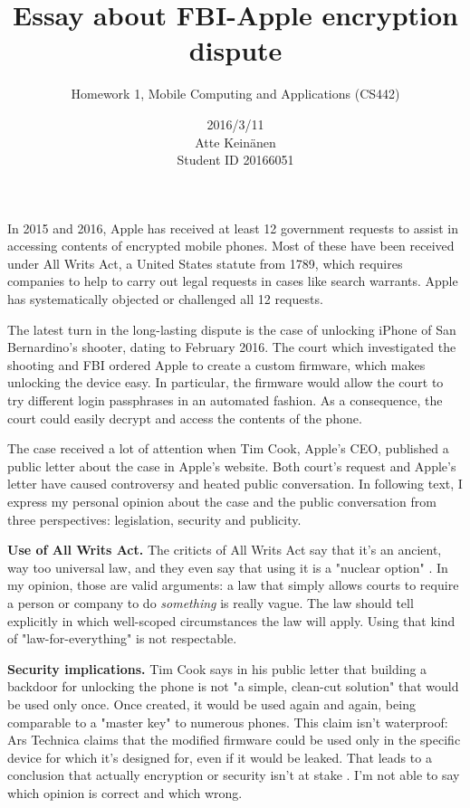 \documentclass[twoside]{article}
\title{Essay about FBI-Apple encryption dispute}
\subtitle{Homework 1, Mobile Computing and Applications (CS442)}
\author{2016/3/11\protect\\Atte Keinänen\protect\\Student ID 20166051}
\date{}
\begin{document}
\maketitle{}

In 2015 and 2016, Apple has received at least 12 government requests to assist in accessing contents of encrypted mobile phones. Most of these have been received under All Writs Act, a United States statute from 1789, which requires companies to help to carry out legal requests in cases like search warrants. Apple has systematically objected or challenged all 12 requests. \cite{courtfilings}

The latest turn in the long-lasting dispute is the case of unlocking iPhone of San Bernardino's shooter, dating to February 2016. The court which investigated the shooting and FBI ordered Apple to create a custom firmware, which makes unlocking the device easy. In particular, the firmware would allow the court to try different login passphrases in an automated fashion. As a consequence, the court could easily decrypt and access the contents of the phone. \cite{mustunlock}

The case received a lot of attention when Tim Cook, Apple's CEO, published a public letter \cite{messagetocustomers} about the case in Apple's website. Both court's request and Apple's letter have caused controversy and heated public conversation. In following text, I express my personal opinion about the case and the public conversation from three perspectives: legislation, security and publicity.

\bigskip\noindent\textbf{Use of All Writs Act.} The criticts of All Writs Act say that it's an ancient, way too universal law, and they even say that using it is a "nuclear option" \cite{mustunlock}. In my opinion, those are valid arguments: a law that simply allows courts to require a person or company to do \textit{something} is really vague. The law should tell explicitly in which well-scoped circumstances the law will apply. Using that kind of "law-for-everything" is not respectable.

\bigskip\noindent\textbf{Security implications.} Tim Cook says in his public letter that building a backdoor for unlocking the phone is not "a simple, clean-cut solution" that would be used only once. Once created, it would be used again and again, being comparable to a "master key" to numerous phones. \cite{messagetocustomers} This claim isn't waterproof: Ars Technica claims that the modified firmware could be used only in the specific device for which it's designed for, even if it would be leaked. That leads to a conclusion that actually encryption or security isn't at stake \cite{isntatsake}. I'm not able to say which opinion is correct and which wrong.
\end{document}
